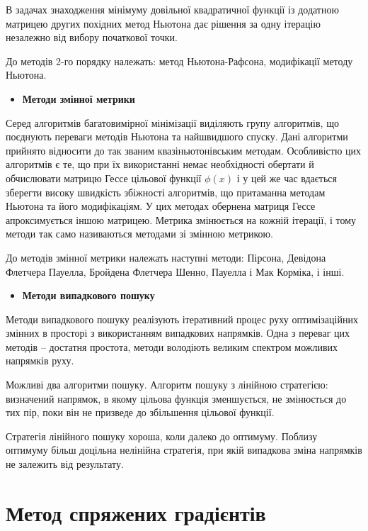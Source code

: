 	В задачах знаходження мінімуму довільної квадратичної функції із додатною матрицею других похідних метод Ньютона дає рішення за одну ітерацію незалежно від вибору початкової точки. 
	
	До методів 2-го порядку належать: метод Ньютона-Рафсона, модифікації методу Ньютона.
\begin{itemize}	
	\item \textbf{Методи змінної метрики}
\end{itemize}

	Серед алгоритмів багатовимірної мінімізації виділяють групу алгоритмів, що поєднують переваги методів Ньютона та найшвидшого спуску. Дані алгоритми прийнято відносити до так званим квазіньютонівським методам. Особливістю цих алгоритмів є те, що при їх використанні немає необхідності обертати й обчислювати матрицю Гессе цільової функції $\phi(x)$ і у цей же час вдається зберегти високу швидкість збіжності алгоритмів, що притаманна методам Ньютона та його модифікаціям. У цих методах обернена матриця Гессе апроксимується іншою матрицею. Метрика змінюється на кожній ітерації, і тому методи так само називаються методами зі змінною метрикою. 
	
	До методів змінної метрики належать наступні методи: Пірсона, Девідона Флетчера Пауелла, Бройдена Флетчера Шенно, Пауелла і Мак Корміка, і інші.
	\newpage
\begin{itemize}
	\item \textbf{Методи випадкового пошуку} 
\end{itemize}

	Методи випадкового пошуку реалізують ітеративний процес руху оптимізаційних змінних в просторі з використанням випадкових напрямків. Одна з переваг цих методів – достатня простота, методи володіють великим спектром можливих напрямків руху. 
		
	Можливі два алгоритми пошуку. Алгоритм пошуку з лінійною стратегією: визначений напрямок, в якому цільова функція зменшується, не змінюється до тих пір, поки він не призведе до збільшення цільової функції. 
		
	Стратегія лінійного пошуку хороша, коли далеко до оптимуму. Поблизу оптимуму більш доцільна нелінійна стратегія, при якій випадкова зміна напрямків не залежить від результату.


\section {Метод спряжених градієнтів}

